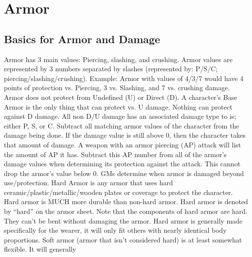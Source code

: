 \documentclass[twoside]{book}
\begin{document}
\section{Armor}
    
\subsection{Basics for Armor and Damage}
      
                  Armor has 3 main values: Piercing, slashing, and
                 crushing. Armor values are represented by 3 numbers
                 separated by slashes (represented by: P/S/C;
                 piercing/slashing/crushing). Example: Armor with values
                 of 4/3/7 would have 4 points of protection vs. Piercing,
                 3 vs. Slashing, and 7 vs. crushing damage. 
                  Armor does not protect from Undefined (U) or
                 Direct (D). 
                  A character’s Base Armor is the only thing
                 that can protect vs. U damage. Nothing can protect
                 against D damage. 
                  All non D/U damage has an associated damage type
                 to is; either P, S, or C. Subtract all matching armor
                 values of the character from the damage being done. If
                 the damage value is still above 0, then the character
                 takes that amount of damage. 
                  A weapon with an armor piercing (AP) attack will
                 list the amount of AP it has. Subtract this AP number
                 from all of the armor’s damage values when
                 determining its protection against the attack. This
                 cannot drop the armor’s value below 0. 
                  GMs determine when armor is damaged beyond
                 use/protection. 
                  Hard Armor is any armor that uses hard
                 ceramic/plastic/metallic/wooden plates or coverage to
                 protect the character. Hard armor is MUCH more durable
                 than non-hard armor. Hard armor is denoted by
                 “hard” on the armor sheet. Note that the
                 components of hard armor are hard. They can’t be
                 bent without damaging the armor. Hard armor is generally
                 made specifically for the wearer, it will only fit
                 others with nearly identical body proportions. 
                  Soft armor (armor that isn’t considered
                 hard) is at least somewhat flexible. It will generally
\end{document}
